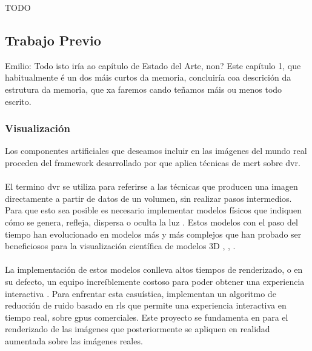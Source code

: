 TODO

\subsection{Trabajo Previo}

{\color{red} Emilio:}
{\color{gray} Todo isto iría ao capítulo de Estado del Arte, non?
  Este capítulo 1, que habitualmente é un dos máis curtos da memoria,
  concluiría coa descrición da estrutura da memoria, que xa faremos
  cando teñamos máis ou menos todo escrito.
}


\subsubsection{Visualización}
Los componentes artificiales que deseamos incluir en las imágenes del mundo real proceden del framework desarrollado por \citeauthor{Kroes2012} que aplica técnicas de \acrfull{mcrt} sobre \acrfull{dvr}.
\paragraph{}
El termino \acrshort{dvr} se utiliza para referirse a las técnicas que producen una imagen directamente a partir de datos de un volumen, sin realizar pasos intermedios. Para que esto sea posible es necesario implementar modelos físicos que indiquen cómo se genera, refleja, dispersa o oculta la luz \cite{Max1995}. Estos modelos con el paso del tiempo han evolucionado en modelos más y más complejos que han probado ser beneficiosos para la visualización científica de modelos 3D \cite{Daz2015}, \cite{Englund2016}, \cite{Lindemann2011} .

\paragraph{}
La implementación de estos modelos conlleva altos tiempos de renderizado, o en su defecto, un equipo increíblemente costoso para poder obtener una experiencia interactiva \cite{IglesiasGuitian2022}. Para enfrentar esta casuística,  \citeauthor{IglesiasGuitian2022} implementan un algoritmo de reducción de ruido basado en \acrfull{rls} que permite una experiencia interactiva en tiempo real, sobre \acrshort{gpu}s comerciales. Este proyecto se fundamenta en \cite{IglesiasGuitian2022} para el renderizado de las imágenes que posteriormente se apliquen en realidad aumentada sobre las imágenes reales.

